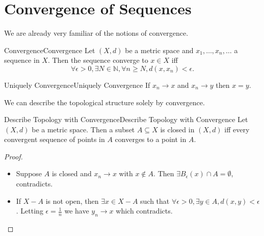 \documentclass[../main.tex]{subfiles}
\begin{document}
\section{Convergence of Sequences}
We are already very familiar of the notions of convergence.

\begin{definition}{Convergence}{Convergence}
Let $(X,d)$ be a metric space and $x_1, \ldots ,x_n, \ldots $ a sequence in $X$. Then the sequence converge to $x\in X$ iff
\begin{equation*}
\forall \epsilon>0, \exists N\in \mathbb{N}, \forall n\geq N,d(x,x_n)<\epsilon.
\end{equation*}
\end{definition}

\begin{proposition}{Uniquely Convergence}{Uniquely Convergence}
If $x_n \rightarrow x$ and $x_n \rightarrow y$ then $x=y$.
\end{proposition}

We can describe the topological structure solely by convergence.
\begin{proposition}{Describe Topology with Convergence}{Describe Topology with Convergence}
Let $(X,d)$ be a metric space. Then a subset $A \subseteq X$ is closed in $(X,d)$ iff every convergent sequence of points in $A$ converges to a point in $A$.
\end{proposition}
\begin{proof}
\begin{itemize}
\item Suppose  $A$ is closed and $x_n \rightarrow x$ with $x\notin A$. Then $\exists B_{\epsilon}(x) \cap A = \emptyset $, contradicts.
\item If $X-A$ is not open, then $\exists x\in X-A$ such that $\forall \epsilon>0, \exists y\in A, d(x,y)<\epsilon$. Letting $\epsilon=\frac{1}{n}$ we have $y_n \rightarrow x$ which contradicts.
\end{itemize}
\end{proof}
\end{document}
